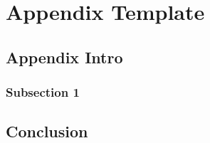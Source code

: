 \chapter{Appendix Template}	\label{appendix}


\section{Appendix Intro} \label{appendix:intro}
\blindtext

\subsection{Subsection 1} \label{appendix:subsection-1}
\blindtext

\section{Conclusion} \label{appendix:conclusion}
\blindtext